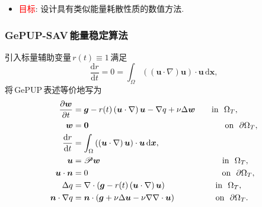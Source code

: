 \documentclass{beamer}
\newcommand{\dif}{\mathrm{d}}
\begin{document}
\begin{CJK*}{UTF8}{gkai}
\begin{frame}
    \begin{itemize}
    \item \textcolor{red}{目标}:
      设计具有类似能量耗散性质的数值方法.
    \end{itemize}
  \end{frame}

  \begin{frame}
    \frametitle{GePUP-SAV\,能量稳定算法}
    引入标量辅助变量\,$r(t)\equiv 1$\,满足
    \begin{equation}
      \frac{\dif r}{\dif t} = 0 = \int_{\Omega} \left( \left( \bm{u}\cdot\nabla \right)\bm{u} \right)\cdot \bm{u}\, \dif \bm{x},
    \end{equation}
    将\,GePUP\,表述等价地写为
    \begin{subequations}
      \label{eq:GePUP}
      \begin{align}
        \frac{\partial\bm{w}}{\partial t}
        &= \bm{g} -r(t)\left(\bm{u}\cdot\nabla\right)\bm{u}
          -\nabla q
          + \nu\Delta\bm{w}
          \qquad \textrm{in }\  \Omega_T,
        \\
        \bm{w} & = \bm{0}
                 \hspace{58mm} \textrm{on }\ \partial \Omega_T,
        \\
        \frac{\dif r}{\dif t} &= \int_{\Omega} \left( \left( \bm{u}\cdot\nabla \right)\bm{u} \right)\cdot \bm{u}\, \dif \bm{x},
        \\
        \bm{u} &= \mathscr{P} \bm{w}
                 \hspace{52mm} \textrm{in }\  \Omega_T,
        \\
        \bm{u}\cdot \bm{n} & = 0 
                             \hspace{57mm} \textrm{on }\ \partial \Omega_T,
        \\
        \Delta q &= \nabla\cdot \left(
                   \bm{g} -r(t)\left(\bm{u}\cdot\nabla\right)\bm{u}
                   \right)
                   \hspace{21mm} \textrm{in }\  \Omega_T,
        \\
        \bm{n}\cdot\nabla q
        &= \bm{n}\cdot \left(
          \bm{g} + \nu\Delta\bm{u}-\nu\nabla\nabla\cdot\bm{u}
          \right) \hspace{17mm} \textrm{on }\ \partial \Omega_T.
      \end{align}
    \end{subequations}
    
  \end{frame}


\end{CJK*}
\end{document}
